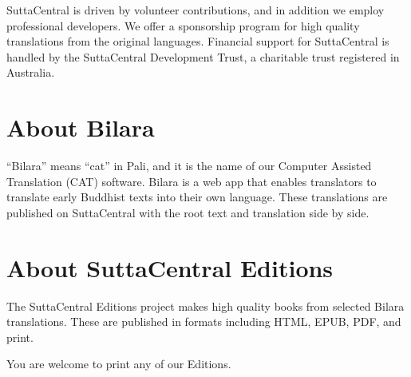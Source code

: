 \documentclass[12pt,openany]{book}%
\begin{document}
SuttaCentral is driven by volunteer contributions, and in addition we employ professional developers. We offer a sponsorship program for high quality translations from the original languages. Financial support for SuttaCentral is handled by the SuttaCentral Development Trust, a charitable trust registered in Australia.

\section*{About Bilara}

“Bilara” means “cat” in Pali, and it is the name of our Computer Assisted Translation (CAT) software. Bilara is a web app that enables translators to translate early Buddhist texts into their own language. These translations are published on SuttaCentral with the root text and translation side by side.

\section*{About SuttaCentral Editions}

The SuttaCentral Editions project makes high quality books from selected Bilara translations. These are published in formats including HTML, EPUB, PDF, and print.

You are welcome to print any of our Editions.

%
\end{document}
